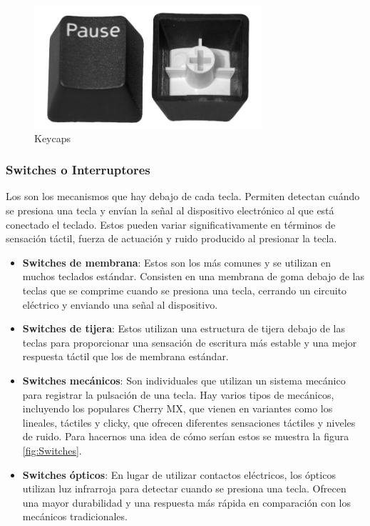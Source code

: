 \begin{figure}[H]
    \centering
    \includegraphics[width=0.75\textwidth]{imagenes/Capitulos/Cap03/Keycaps.png}
    \caption{\gls{Keycaps} \cite{KeycapsImageSource}}
    \label{fig:Keycaps}
\end{figure}

\subsubsection{\gls{Switches} o Interruptores}

Los  son los mecanismos que hay debajo de cada tecla. Permiten detectan cuándo se presiona una tecla y envían la señal al dispositivo electrónico al que está conectado el teclado. Estos  pueden variar significativamente en términos de sensación táctil, fuerza de actuación y ruido producido al presionar la tecla.

\begin{itemize}
  \item \textbf{\gls{Switches} de membrana}: Estos son los más comunes y se utilizan en muchos teclados estándar. Consisten en una membrana de goma debajo de las teclas que se comprime cuando se presiona una tecla, cerrando un circuito eléctrico y enviando una señal al dispositivo.
  
  \item \textbf{\gls{Switches} de tijera}: Estos  utilizan una estructura de tijera debajo de las teclas para proporcionar una sensación de escritura más estable y una mejor respuesta táctil que los  de membrana estándar.
  
  \item \textbf{\gls{Switches} mecánicos}: Son  individuales que utilizan un sistema mecánico para registrar la pulsación de una tecla. Hay varios tipos de  mecánicos, incluyendo los populares  Cherry MX, que vienen en variantes como los  lineales, táctiles y clicky, que ofrecen diferentes sensaciones táctiles y niveles de ruido. Para hacernos una idea de cómo serían estos  se muestra la figura \ref{fig:Switches}.
  
  \item \textbf{\gls{Switches} ópticos}: En lugar de utilizar contactos eléctricos, los  ópticos utilizan luz infrarroja para detectar cuando se presiona una tecla. Ofrecen una mayor durabilidad y una respuesta más rápida en comparación con los  mecánicos tradicionales.
\end{itemize}

